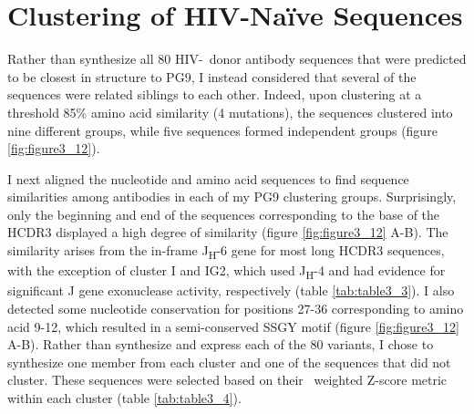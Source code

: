 \section{Clustering of HIV-Na\"{i}ve  Sequences}
Rather than synthesize all 80 HIV-\naive~donor antibody sequences that were predicted to be closest in structure to PG9, I instead considered that several of the sequences were related siblings to each other. Indeed, upon clustering at a threshold 85\% amino acid similarity (4 mutations), the sequences clustered into nine different groups, while five sequences formed independent groups (figure \ref{fig:figure3_12}).

I next aligned the nucleotide and amino acid sequences to find sequence similarities among antibodies in each of my PG9 clustering groups. Surprisingly, only the beginning and end of the sequences corresponding to the base of the HCDR3 displayed a high degree of similarity (figure \ref{fig:figure3_12} A-B). The similarity arises from the in-frame J\textsubscript{H}-6 gene for most long HCDR3 sequences, with the exception of cluster I and IG2, which used J\textsubscript{H}-4 and had evidence for significant J gene exonuclease activity, respectively (table \ref{tab:table3_3}). I also detected some nucleotide conservation for positions 27-36 corresponding to amino acid 9-12, which resulted in a semi-conserved SSGY motif (figure \ref{fig:figure3_12} A-B). Rather than synthesize and express each of the 80 variants, I chose to synthesize one member from each cluster and one of the sequences that did not cluster. These sequences were selected based on their \rosetta~weighted Z-score metric within each cluster (table \ref{tab:table3_4}).

